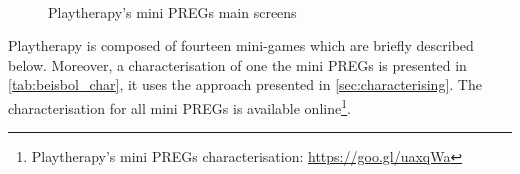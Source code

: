\begin{figure}[bth]
\centering
{}
\\
\caption{Playtherapy's mini \acp{PREG} main screens}
\label{fig:platherapy_screens}
\end{figure}

Playtherapy is composed of fourteen mini-games which are briefly described below. Moreover, a characterisation of one the mini \acp{PREG} is presented in \autoref{tab:beisbol_char}, it uses the approach presented in \autoref{sec:characterising}. The characterisation for all mini \acp{PREG} is available online\footnote{Playtherapy's mini \acp{PREG} characterisation: \url{https://goo.gl/uaxqWa}}.

